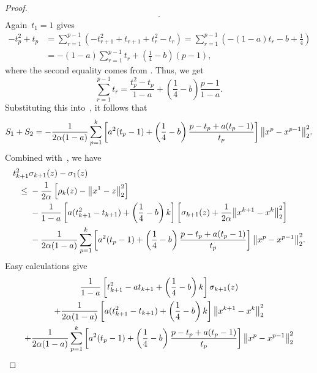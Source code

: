 \documentclass[../main]{subfiles}
\begin{document}
\begin{proof}
\begin{multline}
    .\end{multline}
    Again~$t_1 = 1$ gives
    \begin{align}
            - t_p^2 + t_p &= \sum_{r = 1}^{p - 1} ( - t_{r + 1}^2 + t_{r + 1} + t_r^2 - t_r ) = \sum_{r = 1}^{p - 1} \left(- (1 - a) t_r - b + \frac{1}{4} \right) \\
                          &= - (1 - a) \sum_{r = 1}^{p - 1} t_r + \left( \frac{1}{4} - b \right) (p - 1)
    ,\end{align}
    where the second equality comes from .
    Thus, we get
    \begin{equation} \label{eq:sum t}
        \sum_{r = 1}^{p - 1} t_r = \frac{t_p^2 - t_p}{1 - a} + \left( \frac{1}{4} - b \right) \frac{p - 1}{1 - a}
    .\end{equation} 
    Substituting this into~, it follows that
    \begin{multline}
        S_1 + S_2 = - \frac{1}{2 \alpha (1 - a)} \sum_{p = 1}^{k} \left[ a^2 (t_p - 1) + \left( \frac{1}{4} - b \right) \frac{p - t_p + a (t_p - 1)}{t_p} \right] \norm*{x^p - x^{p - 1}}_2^2
    .\end{multline}
    Combined with~, we have
    \begin{align}
        \MoveEqLeft t_{k + 1}^2 \sigma_{k + 1}(z) - \sigma_1(z) \\
        \le{}& - \frac{1}{2 \alpha} \left[ \rho_k(z) - \norm*{x^1 - z}_2^2 \right] \\
             &- \frac{1}{1 - a} \left[ a (t_{k + 1}^2 - t_{k + 1}) + \left( \frac{1}{4} - b \right) k \right] \left[ \sigma_{k + 1}(z) + \frac{1}{2 \alpha} \norm*{x^{k + 1} - x^k}_2^2 \right] \\
             &- \frac{1}{2 \alpha (1 - a)} \sum_{p = 1}^{k} \left[ a^2 (t_p - 1) + \left( \frac{1}{4} - b \right) \frac{p - t_p + a (t_p - 1)}{t_p} \right] \norm*{x^p - x^{p - 1}}_2^2
    .\end{align}
    Easy calculations give
    \begin{multline}
        \frac{1}{1 - a} \left[ t_{k + 1}^2 - a t_{k + 1} + \left( \frac{1}{4} - b \right) k \right] \sigma_{k + 1}(z) \\
        + \frac{1}{2 \alpha (1 - a)} \left[ a (t_{k + 1}^2 - t_{k + 1}) + \left( \frac{1}{4} - b \right) k \right] \norm*{x^{k + 1} - x^k}_2^2 \\
        + \frac{1}{2 \alpha (1 - a)} \sum_{p = 1}^{k} \left[ a^2 (t_p - 1) + \left( \frac{1}{4} - b \right) \frac{p - t_p + a(t_p - 1)}{t_p} \right] \norm*{x^p - x^{p - 1}}_2^2 \\

\end{multline}
\end{proof}
\end{document}
